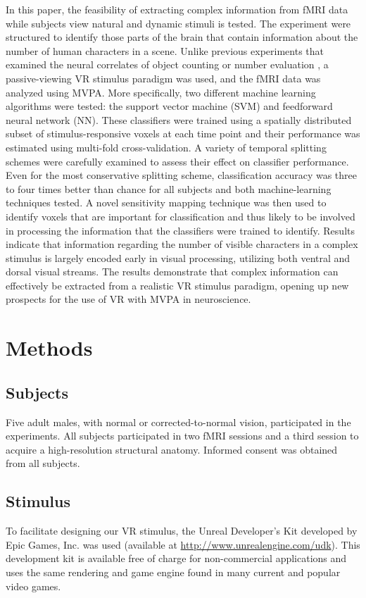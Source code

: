 \documentclass[preprint,5p,authoryear]{elsarticle}
\begin{document}
In this paper, the feasibility of extracting complex information from fMRI data while subjects view natural and dynamic stimuli is tested.
The experiment were structured to identify those parts of the brain that contain information about the number of human characters in a scene.
Unlike previous experiments that examined the neural correlates of object counting or number evaluation \citep{Dehaene1999,Rickard2000,Barth2006}, a passive-viewing VR stimulus paradigm was used, and the fMRI data was analyzed using MVPA.
More specifically, two different machine learning algorithms were tested: the support vector machine (SVM) and feedforward neural network (NN).
These classifiers were trained using a spatially distributed subset of stimulus-responsive voxels at each time point and their performance was estimated using multi-fold cross-validation. 
A variety of temporal splitting schemes were carefully examined to assess their effect on classifier performance.
Even for the most conservative splitting scheme, classification accuracy was three to four times better than chance for all subjects and both machine-learning techniques tested.
A novel sensitivity mapping technique was then used to identify voxels that are important for classification and thus likely to be involved in processing the information that the classifiers were trained to identify.
Results indicate that information regarding  the number of visible characters in a complex stimulus is largely encoded early in visual processing, utilizing both ventral and dorsal visual streams.
The results demonstrate that complex information can effectively be extracted from a realistic VR stimulus paradigm, opening up new prospects for the use of VR with MVPA in neuroscience.

\section{Methods}

\subsection{Subjects}
Five adult males, with normal or corrected-to-normal vision, participated in the experiments. 
All subjects participated in two fMRI sessions and a third session to acquire a high-resolution structural anatomy. 
Informed consent was obtained from all subjects.

\subsection{Stimulus}
To facilitate designing our VR stimulus, the Unreal Developer's Kit developed by Epic Games, Inc. was used (available at \url{http://www.unrealengine.com/udk}).
This development kit is available free of charge for non-commercial applications and uses the same rendering and game engine found in many current and popular video games.
\end{document}
